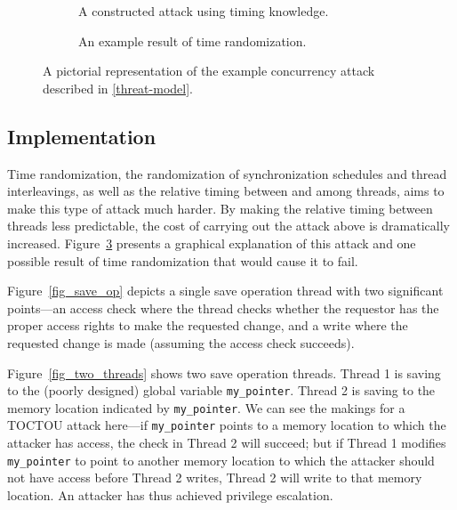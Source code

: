 \begin{figure}
\begin{subfigure}{.49\columnwidth}
		\caption{A constructed attack using timing knowledge.}
		\label{fig_attack}
	\end{subfigure}
	\begin{subfigure}{.49\columnwidth}
		\caption{An example result of time randomization.}
		\label{fig_thwart}
	\end{subfigure}
	\caption{A pictorial representation of the example concurrency attack described in \autoref{threat-model}.}
	\label{fig_exploitation}
\end{figure}
\subsection{Implementation}\label{implementation}
Time randomization, the randomization of synchronization schedules and thread interleavings, as well as the relative timing between and among threads, aims to make this type of attack much harder.
By making the relative timing between threads less predictable, the cost of carrying out the attack above is dramatically increased.
Figure~\ref{fig_exploitation} presents a graphical explanation of this attack and one possible result of time randomization that would cause it to fail.

Figure~\ref{fig_save_op} depicts a single save operation thread with two significant points---an access check where the thread checks whether the requestor has the proper access rights to make the requested change, and a write where the requested change is made (assuming the access check succeeds).

Figure~\ref{fig_two_threads} shows two save operation threads.
Thread 1 is saving to the (poorly designed) global variable \texttt{my\_pointer}.
Thread 2 is saving to the memory location indicated by \texttt{my\_pointer}.
We can see the makings for a TOCTOU attack here---if \texttt{my\_pointer} points to a memory location to which the attacker has access, the check in Thread 2 will succeed; but if Thread 1 modifies \texttt{my\_pointer} to point to another memory location to which the attacker should not have access before Thread 2 writes, Thread 2 will write to that memory location.
An attacker has thus achieved privilege escalation.

